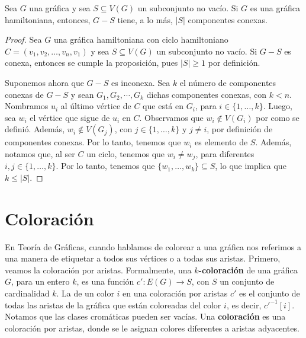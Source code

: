 \begin{proposicion}
\label{prop:hamilt}
   Sea $G$ una gr\'afica y sea $S \subseteq V(G)$ un subconjunto no vac\'io. Si
    $G$ es una gr\'afica hamiltoniana, entonces, $G-S$ tiene, a lo m\'as, $|S|$
    componentes conexas.
\end{proposicion}


\begin{proof}
    Sea $G$ una gr\'afica hamiltoniana con ciclo hamiltoniano $C= (v_1, v_2,
    \dots, v_n, v_1)$ y sea $S \subseteq V(G)$ un subconjunto no vac\'io. Si
    $G-S$ es conexa, entonces se cumple la proposici\'on, pues $|S| \geq 1$ por
    definici\'on.
    
    Suponemos ahora que $G-S$ es inconexa. Sea $k$ el n\'umero de componentes
    conexas de $G-S$ y sean $G_1, G_2, \cdots, G_ k$ dichas componentes conexas,
    con $k < n$. Nombramos $u_i$ al \'ultimo v\'ertice de $C$ que est\'a en
    $G_i$, para $i \in \{1, \dots, k\}$. Luego, sea $w_i$ el v\'ertice que sigue
    de $u_i$ en $C$. Observamos que $w_i \notin V(G_i)$ por como se defini\'o.
    Adem\'as, $w_i \notin V(G_j)$, con $j \in \{1, \dots, k\}$ y $j \neq i$, por
    definici\'on de componentes conexas. Por lo tanto, tenemos que $w_i$ es
    elemento de $S$. Adem\'as, notamos que, al ser $C$ un ciclo, tenemos que
    $w_i \neq w_j$, para diferentes $i,j \in \{1, \dots, k\}$. Por lo tanto,
    tenemos que $\{w_1, \dots, w_k\} \subseteq S$, lo que implica que $k \leq
    |S|$. 
\end{proof} 

\section{Coloraci\'on}
\label{sec:coloracion}

En Teor\'ia de Gr\'aficas, cuando hablamos de colorear a una gr\'afica nos
referimos a una manera de etiquetar a todos sus v\'ertices o a todas sus
aristas. Primero, veamos la coloraci\'on por aristas. Formalmente, una
\textbf{$k$-coloraci\'on}  de una gr\'afica $G$, para un entero $k$,
es una funci\'on $c' \colon E(G)\to S$, con $S$ un conjunto de cardinalidad $k$.
La  de un color $i$ en una coloraci\'on por aristas
$c'$ es el conjunto de todas las aristas de la gr\'afica que est\'an coloreadas
del color $i$, es decir, $c'^{-1}[i]$. Notamos que las clases crom\'aticas
pueden ser vac\'ias. Una \textbf{coloraci\'on}
 es una coloraci\'on por aristas, donde se le asignan
colores diferentes a aristas adyacentes.

